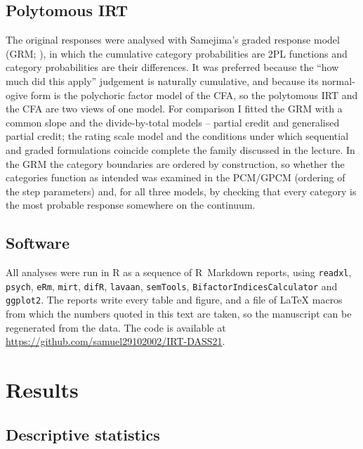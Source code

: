 \documentclass[11pt,a4paper]{article}
\newcommand{\CodeURL}{\url{https://github.com/samuel29102002/IRT-DASS21}}
\begin{document}
\subsection{Polytomous IRT}\label{sec:methods_grm}

The original responses were analysed with Samejima's graded response model (GRM; \citealp{samejima1969estimation}), in which the cumulative category probabilities are
2PL functions and category probabilities are their differences. It was preferred
because the ``how much did this apply'' judgement is naturally cumulative, and because
its normal-ogive form is the polychoric factor model of the CFA, so the polytomous IRT
and the CFA are two views of one model. For comparison I fitted the GRM with a common
slope and the divide-by-total models -- partial credit and
generalised partial credit; the rating scale model and the conditions under which sequential and graded
formulations coincide complete the family discussed in the
lecture. In the GRM the category boundaries are ordered by construction, so whether
the categories function as intended was examined in the PCM/GPCM (ordering of the step
parameters) and, for all three models, by checking that every category is the most
probable response somewhere on the continuum.

\subsection{Software}

All analyses were run in \textsf{R} as a sequence of R~Markdown
reports, using \texttt{readxl}, \texttt{psych}, \texttt{eRm}, \texttt{mirt},
\texttt{difR}, \texttt{lavaan}, \texttt{semTools}, \texttt{BifactorIndicesCalculator}
and \texttt{ggplot2}. The reports write every table and
figure, and a file of LaTeX macros from which the numbers quoted in this text are
taken, so the manuscript can be regenerated from the data. The code is available at
\CodeURL.

\section{Results}\label{sec:results}

\subsection{Descriptive statistics}\label{sec:desc}
\end{document}
